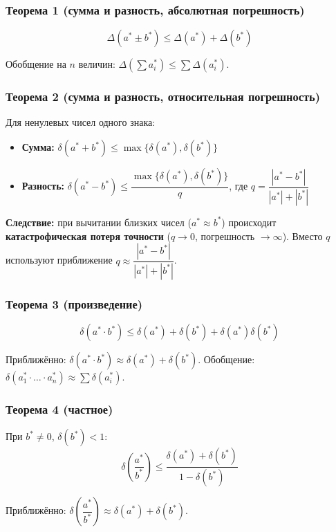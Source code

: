 \documentclass[14pt,a4paper]{extarticle}
\begin{document}
\subsubsection{Теорема 1 (сумма и разность, абсолютная погрешность)}

\[\Delta(a^* \pm b^*) \leq \Delta(a^*) + \Delta(b^*)\]

Обобщение на $n$ величин: $\Delta\!\left(\sum a_i^*\right) \leq \sum \Delta(a_i^*)$.

\subsubsection{Теорема 2 (сумма и разность, относительная погрешность)}

Для ненулевых чисел одного знака:
\begin{itemize}
    \item \textbf{Сумма:} $\delta(a^* + b^*) \leq \max\{\delta(a^*), \delta(b^*)\}$
    \item \textbf{Разность:} $\delta(a^* - b^*) \leq \dfrac{\max\{\delta(a^*), \delta(b^*)\}}{q}$, где $q = \dfrac{|a^* - b^*|}{|a^*| + |b^*|}$
\end{itemize}

\textbf{Следствие:} при вычитании близких чисел ($a^* \approx b^*$) происходит \textbf{катастрофическая потеря точности} ($q \to 0$, погрешность $\to \infty$). Вместо $q$ используют приближение $q \approx \dfrac{|a^* - b^*|}{|a^*| + |b^*|}$.

\subsubsection{Теорема 3 (произведение)}

\[\delta(a^* \cdot b^*) \leq \delta(a^*) + \delta(b^*) + \delta(a^*)\delta(b^*)\]

Приближённо: $\delta(a^* \cdot b^*) \approx \delta(a^*) + \delta(b^*)$. Обобщение: $\delta(a_1^* \cdot \ldots \cdot a_n^*) \approx \sum \delta(a_i^*)$.

\subsubsection{Теорема 4 (частное)}

При $b^* \neq 0$, $\delta(b^*) < 1$:
\[\delta\!\left(\frac{a^*}{b^*}\right) \leq \frac{\delta(a^*) + \delta(b^*)}{1 - \delta(b^*)}\]

Приближённо: $\delta\!\left(\dfrac{a^*}{b^*}\right) \approx \delta(a^*) + \delta(b^*)$.
\end{document}
